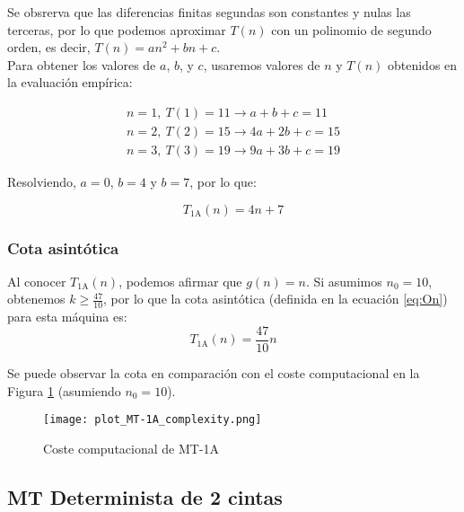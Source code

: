 Se obsrerva que las diferencias finitas segundas son constantes y nulas las terceras, por lo que podemos aproximar $T(n)$ con un polinomio de segundo orden, es decir, $T(n) = an^2 + bn + c$.\\

Para obtener los valores de $a$, $b$, y $c$, usaremos valores de $n$ y $T(n)$ obtenidos en la evaluación empírica:

\begin{subequations}
    \begin{gather}
        n = 1,\ T(1) = 11 \rightarrow a + b + c = 11 \\
        n = 2,\ T(2) = 15 \rightarrow 4a + 2b + c = 15 \\
        n = 3,\ T(3) = 19 \rightarrow 9a + 3b + c = 19
    \end{gather}
\end{subequations}

Resolviendo, $a=0$, $b=4$ y $b=7$, por lo que:

\begin{equation}
    T_{\mathrm{1A}}(n) = 4n + 7
\end{equation}

\subsubsection*{Cota asintótica}
Al conocer $T_{\mathrm{1A}}(n)$, podemos afirmar que $g(n) = n$. Si asumimos $n_0 = 10$, obtenemos $k \geq \frac{47}{10}$, por lo que la cota asintótica (definida en la ecuación \ref{eq:On}) para esta máquina es:
\begin{equation}
    T_{\mathrm{1A}}(n) = \frac{47}{10} n
\end{equation}


Se puede observar la cota en comparación con el coste computacional en la Figura \ref{fig:MT-1A_plot} (asumiendo $n_0 = 10$).

\begin{figure}[h]
    \centering
    \texttt{[image: plot\_MT-1A\_complexity.png]}
    \caption{Coste computacional de MT-1A}
    \label{fig:MT-1A_plot}
\end{figure}



\subsection{MT Determinista de 2 cintas}

